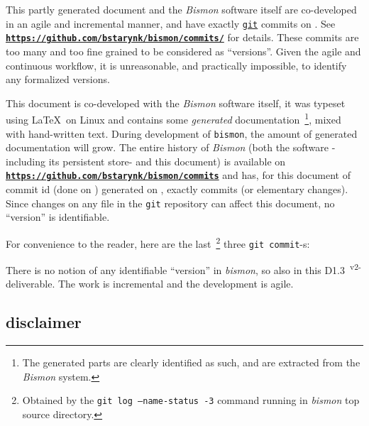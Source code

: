 \documentclass[11pt,a4paper,svgnames]{article}
\newcommand{\bmurl}[1]{{\href{#1}{\texttt{\textbf{#1}}}}}
\begin{document}
\begin{titlepage}
This partly generated document and the \emph{Bismon} software itself
are co-developed in an agile and incremental manner, and have exactly {\bmgitnumbercommits} \href{http://git-scm.com/}{\texttt{git}}
commits on \textit{\bmdoctimestamp}. See
\bmurl{https://github.com/bstarynk/bismon/commits/} for details. These commits are too many and too fine grained to be considered as ``versions''. Given the agile and continuous workflow, it is unreasonable, and practically impossible, to identify any formalized versions.

\begin{relsize}{-0.5}
This document is co-developed with the \emph{Bismon} software itself,
it was typeset using \LaTeX~on Linux and contains some \emph{generated}
documentation~\footnote{The generated parts are clearly identified as
  such, and are extracted from the \emph{Bismon} system.}, mixed with
hand-written text. During development of \texttt{bismon}, the amount
of generated documentation will grow.  The entire history of
\emph{Bismon} (both the software -including its persistent store- and
this document) is available on
\bmurl{https://github.com/bstarynk/bismon/commits} and has, for this
document of commit id \texttt{\bmgitcommit} (done on \emph{\bmgitdate}) generated on
\textit{\bmdocdate}, exactly {\bmgitnumbercommits} commits (or
elementary changes). Since changes on any file in the \texttt{git}
repository can affect this document, no ``version'' is identifiable.
\end{relsize}
\bigskip

For convenience to the reader, here are the last~\footnote{Obtained by the
  \texttt{git log --name-status -3} command running in \emph{bismon}
  top source directory.} three \texttt{git commit}-s:

\begin{relsize}{-2}
  
\end{relsize}

There is no notion of any identifiable ``version'' in \emph{bismon}, so
also in this D1.3~\textsuperscript{v2-} deliverable. The work is incremental and the
development is agile.

\bigskip

\subsection*{disclaimer}

\begin{center}
\end{center}
\end{titlepage}
\end{document}
